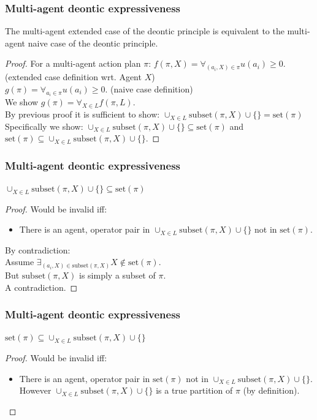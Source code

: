 \documentclass{beamer}
\begin{document}
\begin{frame}
\frametitle{Multi-agent deontic expressiveness}
\begin{theorem}
The multi-agent extended case of the deontic principle is equivalent to the multi-agent naive case of the deontic principle.
\end{theorem}
\begin{proof}
For a multi-agent action plan $\pi$:
$f(\pi,X)=\forall_{(a_i,X) \in \pi} u(a_i)\geq 0$. (extended case definition wrt. Agent $X$)\\
$g(\pi) = \forall_{a_i \in \pi} u(a_i)\geq 0$. (naive case definition)\\
We show $g(\pi)=\forall_{X \in L} f(\pi, L)$.\\
By previous proof it is sufficient to show: $\cup_{X \in L} \textrm{subset}(\pi,X) \cup \{\}=\textrm{set}(\pi)$\\
Specifically we show:  $\cup_{X \in L} \textrm{subset}(\pi,X) \cup \{\} \subseteq \textrm{set}(\pi)$ and $ \textrm{set}(\pi) \subseteq \cup_{X \in L} \textrm{subset}(\pi,X) \cup \{\} $.
\end{proof}
\end{frame}

\begin{frame}
\frametitle{Multi-agent deontic expressiveness}
\begin{theorem}
$\cup_{X \in L} \textrm{subset}(\pi,X) \cup \{\} \subseteq \textrm{set}(\pi)$
\end{theorem}
\begin{proof}
Would be invalid iff:
\begin{itemize}
\item There is an agent, operator pair in $\cup_{X \in L} \textrm{subset}(\pi,X) \cup \{\}$ not in $ \textrm{set}(\pi)$.
\end{itemize}
By contradiction:\\
Assume $\exists_{(a_i,X) \in \textrm{subset}(\pi,X)} X \notin \textrm{set}(\pi)$.\\
But $\textrm{subset}(\pi,X)$ is simply a subset of $\pi$.\\
A contradiction.
\end{proof}
\end{frame}

\begin{frame}
\frametitle{Multi-agent deontic expressiveness}
\begin{theorem}
$\textrm{set}(\pi) \subseteq \cup_{X \in L} \textrm{subset}(\pi,X) \cup \{\}$
\end{theorem}
\begin{proof}
Would be invalid iff:
\begin{itemize}
\item There is an agent, operator pair in $ \textrm{set}(\pi)$ not in $\cup_{X \in L} \textrm{subset}(\pi,X) \cup \{\}$.\\
However $\cup_{X \in L} \textrm{subset}(\pi,X) \cup \{\}$ is a true partition of $\pi$ (by definition).



\end{itemize}
\end{proof}
\end{frame}
\end{document}
